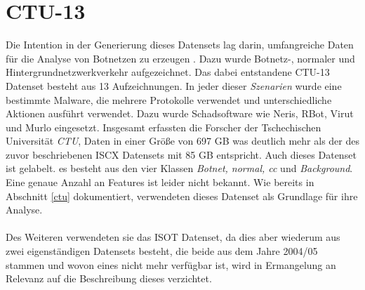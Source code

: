 \documentclass[
    12pt, %
    DIV10,
    ngerman, %
    a4paper, %
    oneside, %
    titlepage, %
    parskip=half, %
    headings=normal, %
    listof=totoc, %
    bibliography=totoc, %
    index=totoc, %
    captions=tableheading, %
    final %
]{scrreprt}
\begin{document}
\section{CTU-13}
Die Intention in der Generierung dieses Datensets lag darin, umfangreiche Daten für die Analyse von Botnetzen zu erzeugen \parencite{garcia2014empirical}. Dazu wurde Botnetz-, normaler und Hintergrundnetzwerkverkehr aufgezeichnet. Das dabei entstandene CTU-13 Datenset besteht aus 13 Aufzeichnungen. In jeder dieser \emph{Szenarien} wurde eine bestimmte Malware, die mehrere Protokolle verwendet und unterschiedliche Aktionen ausführt verwendet. Dazu wurde Schadsoftware wie Neris, RBot, Virut und Murlo eingesetzt. Insgesamt erfassten die Forscher der Tschechischen Universität \emph{CTU}, Daten in einer Größe von 697 GB was deutlich mehr als der des zuvor beschriebenen ISCX Datensets mit 85 GB entspricht. Auch dieses Datenset ist gelabelt. es besteht aus den vier Klassen \emph{Botnet, normal, \ac{cc}} und \emph{Background}. Eine genaue Anzahl an Features ist leider nicht bekannt.
Wie bereits in Abschnitt \ref{ctu} dokumentiert, verwendeten \textcite{Mathur2018} dieses Datenset als Grundlage für ihre Analyse.\\\\
Des Weiteren verwendeten sie das ISOT Datenset, da dies aber wiederum aus zwei eigenständigen Datensets besteht, die beide aus dem Jahre 2004/05 stammen und wovon eines nicht mehr verfügbar ist, wird in Ermangelung an Relevanz auf die Beschreibung dieses verzichtet.
\end{document}
